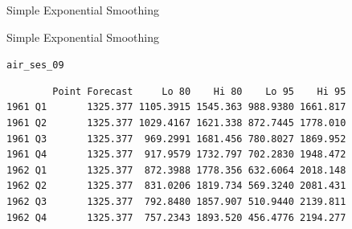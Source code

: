 \documentclass{beamer}\usepackage[]{graphicx}\usepackage[]{color}
\makeatletter
\newcommand{\hlnum}[1]{\textcolor[rgb]{0.824,0.412,0.118}{#1}}%
\newcommand{\hlstr}[1]{\textcolor[rgb]{1,0.894,0.71}{#1}}%
\newcommand{\hlopt}[1]{\textcolor[rgb]{1,0.894,0.769}{#1}}%
\newcommand{\hlstd}[1]{\textcolor[rgb]{1,0.894,0.769}{#1}}%
\newcommand{\hlkwb}[1]{\textcolor[rgb]{0.804,0.776,0.451}{#1}}%
\newcommand{\hlkwc}[1]{\textcolor[rgb]{0.78,0.941,0.545}{#1}}%
\newcommand{\hlkwd}[1]{\textcolor[rgb]{1,0.78,0.769}{#1}}%
\newenvironment{kframe}{%
 \def\at@end@of@kframe{}%
 \ifinner\ifhmode%
  \def\at@end@of@kframe{\end{minipage}}%
  \begin{minipage}{\columnwidth}%
 \fi\fi%
 \def\FrameCommand##1{\hskip\@totalleftmargin \hskip-\fboxsep
 \colorbox{shadecolor}{##1}\hskip-\fboxsep
     \hskip-\linewidth \hskip-\@totalleftmargin \hskip\columnwidth}%
 \MakeFramed {\advance\hsize-\width
   \@totalleftmargin\z@ \linewidth\hsize
   \@setminipage}}%
 {\par\unskip\endMakeFramed%
 \at@end@of@kframe}
\newenvironment{knitrout}{}{} %
\makeatother
\begin{document}
\begin{darkframes}
\begin{frame}[fragile]{Simple Exponential Smoothing}
\begin{knitrout}
\end{knitrout}
    \end{frame}
    
    \begin{frame}[fragile]{Simple Exponential Smoothing}
      \fontsize{8}{8}\selectfont
\begin{knitrout}
\begin{kframe}
\begin{alltt}
\hlstd{air_ses_09}
\end{alltt}
\begin{verbatim}
        Point Forecast     Lo 80    Hi 80    Lo 95    Hi 95
1961 Q1       1325.377 1105.3915 1545.363 988.9380 1661.817
1961 Q2       1325.377 1029.4167 1621.338 872.7445 1778.010
1961 Q3       1325.377  969.2991 1681.456 780.8027 1869.952
1961 Q4       1325.377  917.9579 1732.797 702.2830 1948.472
1962 Q1       1325.377  872.3988 1778.356 632.6064 2018.148
1962 Q2       1325.377  831.0206 1819.734 569.3240 2081.431
1962 Q3       1325.377  792.8480 1857.907 510.9440 2139.811
1962 Q4       1325.377  757.2343 1893.520 456.4776 2194.277
\end{verbatim}
\end{kframe}
\end{knitrout}
    \end{frame}
    
    
    
    
    

\end{darkframes}
\end{document}
